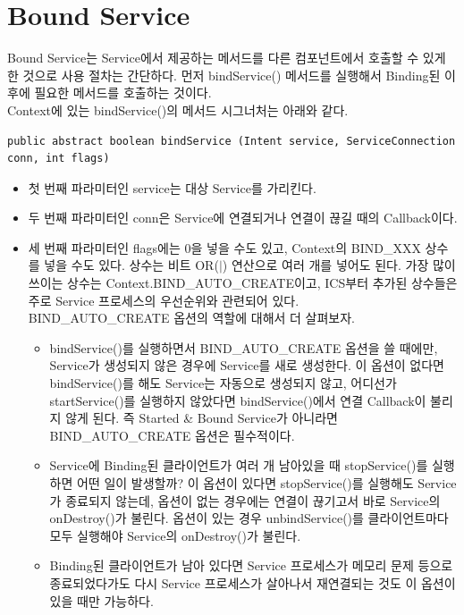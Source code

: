 \section{Bound Service}
Bound Service는 Service에서 제공하는 메서드를 다른 컴포넌트에서 호출할 수 있게 한 것으로 사용 절차는 간단하다. 
먼저 bindService() 메서드를 실행해서 Binding된 이후에 필요한 메서드를 호출하는 것이다.\\

Context에 있는 bindService()의 메서드 시그너처는 아래와 같다.
\begin{lstlisting}[frame=single]
public abstract boolean bindService (Intent service, ServiceConnection conn, int flags)
\end{lstlisting}

\begin{itemize}
\item 첫 번째 파라미터인 service는 대상 Service를 가리킨다.
\item 두 번째 파라미터인 conn은 Service에 연결되거나 연결이 끊길 때의 Callback이다.
\item 세 번째 파라미터인 flags에는 0을 넣을 수도 있고, Context의 BIND\_XXX 상수를 넣을 수도 있다. 상수는 비트 OR($|$) 연산으로 여러 개를 넣어도 된다. 
가장 많이 쓰이는 상수는 Context.BIND\_AUTO\_CRE\-ATE이고, ICS부터 추가된 상수들은 주로 Service 프로세스의 우선순위와 관련되어 있다.\\ 

BIND\_AUTO\_CREATE 옵션의 역할에 대해서 더 살펴보자.
\begin{itemize}
\item bindService()를 실행하면서 BIND\_AUTO\_CREATE 옵션을 쓸 때에만, Service가 생성되지 않은 경우에 Service를 새로 생성한다. 
이 옵션이 없다면 bindService()를 해도 Service는 자동으로 생성되지 않고, 어디선가 startService()를 실행하지 않았다면 bindService()에서 연결 Callback이 불리지 않게 된다.
즉 Started \& Bound Service가 아니라면 BIND\_AUTO\_CREATE 옵션은 필수적이다. 

\item Service에 Binding된 클라이언트가 여러 개 남아있을 때 stopService()를 실행하면 어떤 일이 발생할까? 이 옵션이 있다면 stopService()를 실행해도 Service가 종료되지 않는데, 옵션이 없는 경우에는 연결이 끊기고서 바로 Service의 onDestroy()가 불린다.
옵션이 있는 경우 unbindService()를 클라이언트마다 모두 실행해야 Service의 onDestroy()가 불린다.

\item Binding된 클라이언트가 남아 있다면 Service 프로세스가 메모리 문제 등으로 종료되었다가도 다시 Service 프로세스가 살아나서 재연결되는 것도 이 옵션이 있을 때만 가능하다. 
\end{itemize}

\end{itemize}


